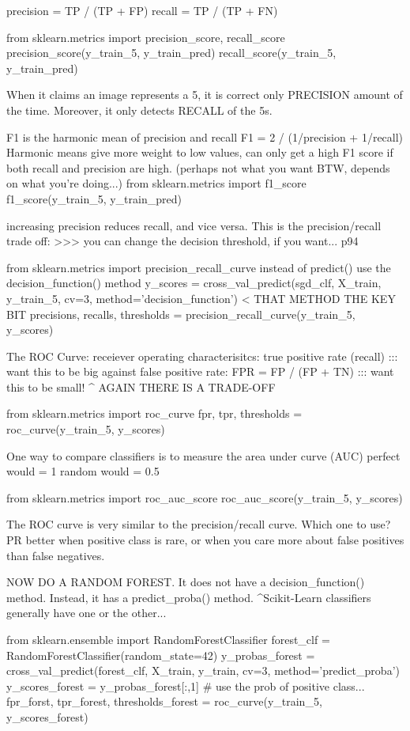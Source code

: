 precision = TP / (TP + FP)
recall = TP / (TP + FN)

from sklearn.metrics import precision_score, recall_score
precision_score(y_train_5, y_train_pred)
recall_score(y_train_5, y_train_pred)

When it claims an image represents a 5,
it is correct only PRECISION amount of the time.
Moreover, it only detects RECALL of the 5s.

F1 is the harmonic mean of precision and recall
F1 = 2 / (1/precision + 1/recall)
Harmonic means give more weight to low values,
can only get a high F1 score if both recall and precision are high.
(perhaps not what you want BTW, depends on what you're doing...)
from sklearn.metrics import f1_score
f1_score(y_train_5, y_train_pred)

increasing precision reduces recall, and vice versa.
This is the precision/recall trade off:
>>> you can change the decision threshold, if you want... p94

from sklearn.metrics import precision_recall_curve
instead of predict() use the decision_function() method
y_scores = cross_val_predict(sgd_clf, X_train, y_train_5, cv=3, method='decision_function') < THAT METHOD THE KEY BIT
precisions, recalls, thresholds = precision_recall_curve(y_train_5, y_scores)

The ROC Curve:
receiever operating characterisitcs:
true positive rate (recall) ::: want this to be big
against false positive rate:
FPR = FP / (FP + TN) ::: want this to be small!
^ AGAIN THERE IS A TRADE-OFF

from sklearn.metrics import roc_curve
fpr, tpr, thresholds = roc_curve(y_train_5, y_scores)

One way to compare classifiers is to measure the area under curve (AUC)
perfect would = 1
random would = 0.5

from sklearn.metrics import roc_auc_score
roc_auc_score(y_train_5, y_scores)

The ROC curve is very similar to the precision/recall curve.
Which one to use?
PR better when positive class is rare,
or when you care more about false positives than false negatives.

NOW DO A RANDOM FOREST.
It does not have a decision_function() method.
Instead, it has a predict_proba() method.
^Scikit-Learn classifiers generally have one or the other...

from sklearn.ensemble import RandomForestClassifier
forest_clf = RandomForestClassifier(random_state=42)
y_probas_forest = cross_val_predict(forest_clf, X_train, y_train, cv=3, method='predict_proba')
y_scores_forest = y_probas_forest[:,1] # use the prob of positive class...
fpr_forst, tpr_forest, thresholds_forest = roc_curve(y_train_5, y_scores_forest)



